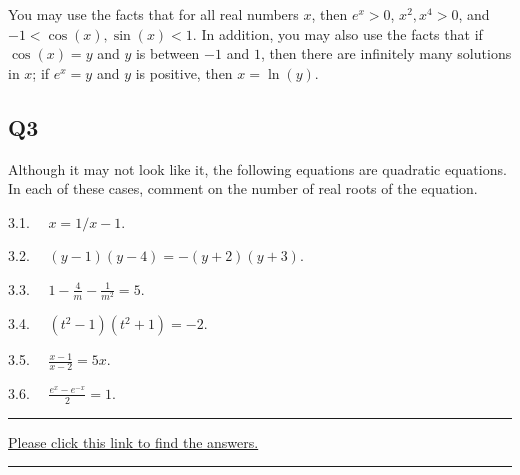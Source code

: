 \documentclass[
  12pt,
  a4paper, oneside]{starmastarticle}
\begin{document}
You may use the facts that for all real numbers \(x\), then \(e^x > 0\),
\(x^2, x^4 > 0\), and \(-1 < \cos(x), \sin(x) < 1\). In addition, you
may also use the facts that if \(\cos(x) = y\) and \(y\) is between
\(-1\) and \(1\), then there are infinitely many solutions in \(x\); if
\(e^x = y\) and \(y\) is positive, then \(x = \ln(y)\).

\hypertarget{q3}{%
\subsection*{Q3}\label{q3}}

Although it may not look like it, the following equations are quadratic
equations. In each of these cases, comment on the number of real roots
of the equation.

3.1. \(\quad x = 1/x - 1\).

3.2. \(\quad (y-1)(y-4) = -(y+2)(y+3)\).

3.3. \(\quad \displaystyle 1 - \frac{4}{m} - \frac{1}{m^2} = 5\).

3.4. \(\quad (t^2-1)(t^2+1) = -2\).

3.5. \(\quad \displaystyle \frac{x-1}{x-2} = 5x\).

3.6. \(\quad \displaystyle \frac{e^{x} - e^{-x}}{2} = 1\).

\begin{center}\rule{0.5\linewidth}{0.5pt}\end{center}

\href{as-introtoquadratics.qmd}{Please click this link to find the
answers.}

\begin{center}\rule{0.5\linewidth}{0.5pt}\end{center}
\end{document}
